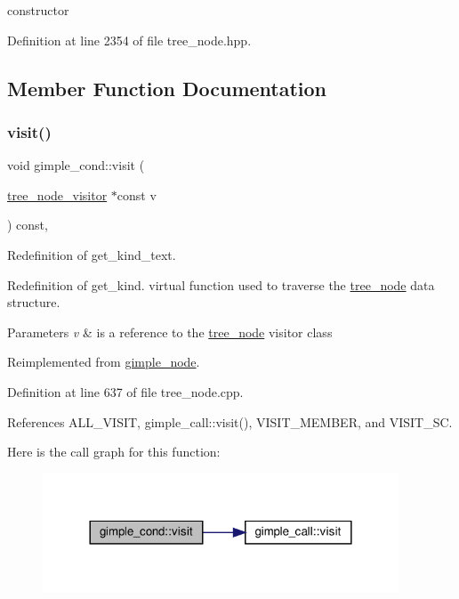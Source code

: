 constructor 



Definition at line 2354 of file tree\+\_\+node.\+hpp.



\subsection{Member Function Documentation}
\mbox{\label{structgimple__cond_a1985767ad1b09766b8d32897826dbf48}} 
\subsubsection{\texorpdfstring{visit()}{visit()}}
{\footnotesize\ttfamily void gimple\+\_\+cond\+::visit (\begin{DoxyParamCaption}\item[{\hyperlink{classtree__node__visitor}{tree\+\_\+node\+\_\+visitor} $\ast$const}]{v }\end{DoxyParamCaption}) const\hspace{0.3cm}{\ttfamily [override]}, {\ttfamily [virtual]}}



Redefinition of get\+\_\+kind\+\_\+text. 

Redefinition of get\+\_\+kind. virtual function used to traverse the \hyperlink{classtree__node}{tree\+\_\+node} data structure. 
\begin{DoxyParams}{Parameters}
{\em v} & is a reference to the \hyperlink{classtree__node}{tree\+\_\+node} visitor class \\
\hline
\end{DoxyParams}


Reimplemented from \hyperlink{structgimple__node_a337b029a3aca9c1b96311b6e6668f7f3}{gimple\+\_\+node}.



Definition at line 637 of file tree\+\_\+node.\+cpp.



References A\+L\+L\+\_\+\+V\+I\+S\+IT, gimple\+\_\+call\+::visit(), V\+I\+S\+I\+T\+\_\+\+M\+E\+M\+B\+ER, and V\+I\+S\+I\+T\+\_\+\+SC.

Here is the call graph for this function\+:
\nopagebreak
\begin{figure}[H]
\begin{center}
\leavevmode
\includegraphics[width=300pt]{dd/ddd/structgimple__cond_a1985767ad1b09766b8d32897826dbf48_cgraph}
\end{center}
\end{figure}


